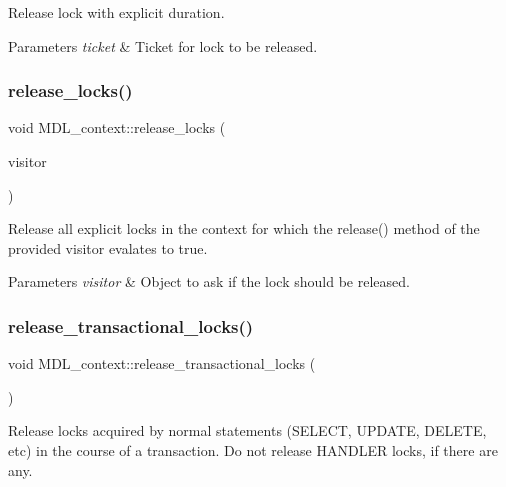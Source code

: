 Release lock with explicit duration.


\begin{DoxyParams}{Parameters}
{\em ticket} & Ticket for lock to be released. \\
\hline
\end{DoxyParams}
\mbox{\label{classMDL__context_a71874a5e485217650429849ab29ed43b}} 
\subsubsection{\texorpdfstring{release\+\_\+locks()}{release\_locks()}}
{\footnotesize\ttfamily void M\+D\+L\+\_\+context\+::release\+\_\+locks (\begin{DoxyParamCaption}\item[{\mbox{\hyperlink{classMDL__release__locks__visitor}{M\+D\+L\+\_\+release\+\_\+locks\+\_\+visitor}} $\ast$}]{visitor }\end{DoxyParamCaption})}

Release all explicit locks in the context for which the release() method of the provided visitor evalates to true.


\begin{DoxyParams}{Parameters}
{\em visitor} & Object to ask if the lock should be released. \\
\hline
\end{DoxyParams}
\mbox{\label{classMDL__context_afce65a72bedc0c4384b2b4c231c070ed}} 
\subsubsection{\texorpdfstring{release\+\_\+transactional\+\_\+locks()}{release\_transactional\_locks()}}
{\footnotesize\ttfamily void M\+D\+L\+\_\+context\+::release\+\_\+transactional\+\_\+locks (\begin{DoxyParamCaption}{ }\end{DoxyParamCaption})}

Release locks acquired by normal statements (S\+E\+L\+E\+CT, U\+P\+D\+A\+TE, D\+E\+L\+E\+TE, etc) in the course of a transaction. Do not release H\+A\+N\+D\+L\+ER locks, if there are any.

